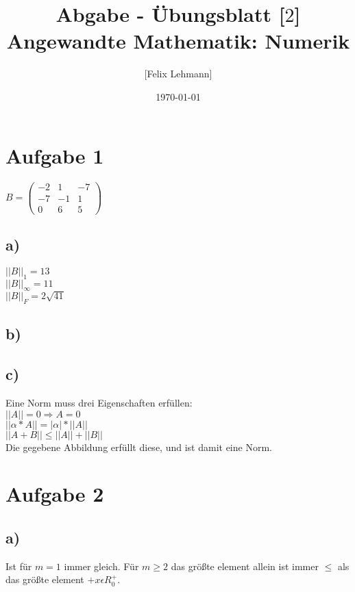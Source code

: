 \documentclass[10pt,a4paper]{article}
\begin{document}
\title{Abgabe - Übungsblatt [$2$]\\
\small{Angewandte Mathematik: Numerik}}
\author{ [Felix Lehmann] }
\date{\today}
\maketitle

\section*{Aufgabe 1}
$B = \begin{pmatrix}
    -2 &  1 & -7\\
    -7 & -1 &  1\\
     0 &  6 &  5
    \end{pmatrix}$

\subsection*{a)}
$||B||_1 = 13$\\
$||B||_\infty = 11$\\
$||B||_F = 2\sqrt{41}$

\subsection*{b)}


\subsection*{c)}
Eine Norm muss drei Eigenschaften erfüllen:\\
$||A|| = 0 \Rightarrow A = 0$\\
$||\alpha*A|| = |\alpha|*||A||$\\
$||A+B|| \leq ||A|| + ||B||$\\
Die gegebene Abbildung erfüllt diese, und ist damit eine Norm.

\section*{Aufgabe 2}
\subsection*{a)}
Ist für $m=1$ immer gleich.
Für $m \geq 2$ das größte element allein ist immer $\leq$ als das größte element $+ x\epsilon R_0^+$.
\end{document}
